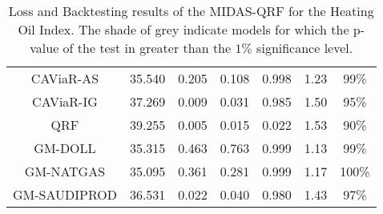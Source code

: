 \begin{table}[H]
\begin{tabular}{ccccccc}
\rowcolor[HTML]{D9D9D9} CAViaR-AS  & 35.540 & 0.205    & 0.108    & 0.998    & 1.23 & 99\%   \\
 CAViaR-IG  & 37.269 & 0.009    & 0.031    & 0.985    & 1.50 & 95\%   \\
 QRF        & 39.255 & 0.005    & 0.015    & 0.022    & 1.53 & 90\%   \\
\rowcolor[HTML]{D9D9D9} GM-DOLL    & 35.315 & 0.463    & 0.763    & 0.999    & 1.13 & 99\%   \\
\rowcolor[HTML]{D9D9D9} GM-NATGAS  & 35.095 & 0.361    & 0.281    & 0.999    & 1.17 & 100\%  \\
\rowcolor[HTML]{D9D9D9}GM-SAUDIPROD                                            & 36.531 & 0.022    & 0.040    & 0.980    & 1.43 & 97\%  \\ \hline
\end{tabular}
\caption{Loss and Backtesting results of the MIDAS-QRF for the Heating Oil Index.  The shade of grey indicate models for which the p-value of the test in greater than the $1\%$ significance level.}
\label{tab:heat}

\end{table}